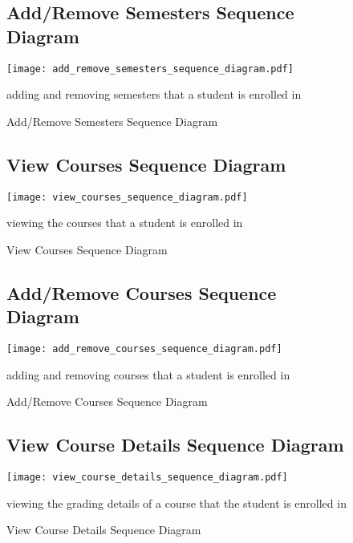 \documentclass[12pt]{article}
\begin{document}
\begin{figure}[p!]
  \subsection{Add/Remove Semesters Sequence Diagram}
  \centering
  \texttt{[image: add\_remove\_semesters\_sequence\_diagram.pdf]}
  \caption{Add/Remove Semesters Sequence Diagram}
  \label{fig:addRemoveSemestersSequenceDiagram}
  {adding and removing semesters that a student is enrolled in}
\end{figure}

\begin{figure}[p!]
  \subsection{View Courses Sequence Diagram}
  \centering
  \texttt{[image: view\_courses\_sequence\_diagram.pdf]}
  \caption{View Courses Sequence Diagram}
  \label{fig:viewCoursesSequenceDiagram}
  {viewing the courses that a student is enrolled in}
\end{figure}

\begin{figure}[p!]
  \subsection{Add/Remove Courses Sequence Diagram}
  \centering
  \texttt{[image: add\_remove\_courses\_sequence\_diagram.pdf]}
  \caption{Add/Remove Courses Sequence Diagram}
  \label{fig:addRemoveCoursesSequenceDiagram}
  {adding and removing courses that a student is enrolled in}
\end{figure}

\begin{figure}[p!]
  \subsection{View Course Details Sequence Diagram}
  \centering
  \texttt{[image: view\_course\_details\_sequence\_diagram.pdf]}
  \caption{View Course Details Sequence Diagram}
  \label{fig:viewCourseDetailsSequenceDiagram}
  {viewing the grading details of a course that the student is enrolled in}
\end{figure}
\end{document}
